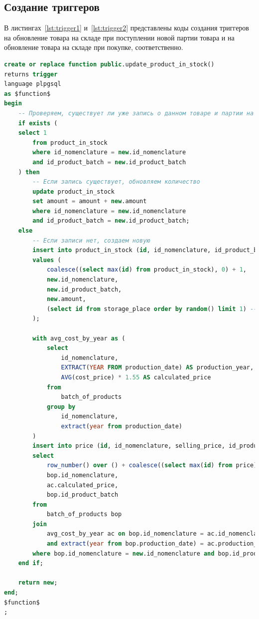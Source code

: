 \subsection{Создание триггеров}
В листингах~\ref{lst:trigger1} и~\ref{lst:trigger2} представлены коды создания триггеров на обновление товара на складе при поступлении новой партии товара и на обновление товара на складе при покупке, соответственно.
\begin{lstlisting}[label=lst:trigger1, caption=Создание триггера на обновление товара на складе при поступлении новой партии товара, language=SQL]
create or replace function public.update_product_in_stock()
returns trigger
language plpgsql
as $function$
begin
	-- Проверяем, существует ли уже запись о данном товаре и партии на складе
	if exists (
	select 1 
		from product_in_stock 
		where id_nomenclature = new.id_nomenclature 
		and id_product_batch = new.id_product_batch
	) then
		-- Если запись существует, обновляем количество
		update product_in_stock
		set amount = amount + new.amount
		where id_nomenclature = new.id_nomenclature 
		and id_product_batch = new.id_product_batch;
	else
		-- Если записи нет, создаем новую
		insert into product_in_stock (id, id_nomenclature, id_product_batch, amount, storage_place)
		values (
			coalesce((select max(id) from product_in_stock), 0) + 1,
			new.id_nomenclature,
			new.id_product_batch,
			new.amount,
			(select id from storage_place order by random() limit 1) -- случайное место хранения
		);
		
		with avg_cost_by_year as (
			select 
				id_nomenclature,
				EXTRACT(YEAR FROM production_date) AS production_year,
				AVG(cost_price) * 1.55 AS calculated_price
			from 
				batch_of_products
			group by
				id_nomenclature, 
				extract(year from production_date)
		)
		insert into price (id, id_nomenclature, selling_price, id_product_batch)
		select 
			row_number() over () + coalesce((select max(id) from price), 0),
			bop.id_nomenclature,
			ac.calculated_price,
			bop.id_product_batch
		from 
			batch_of_products bop 
		join 
			avg_cost_by_year ac on bop.id_nomenclature = ac.id_nomenclature 
			and extract(year from bop.production_date) = ac.production_year
		where bop.id_nomenclature = new.id_nomenclature and bop.id_product_batch = new.id_product_batch;
	end if;
	
	return new;
end;
$function$
;
\end{lstlisting}

